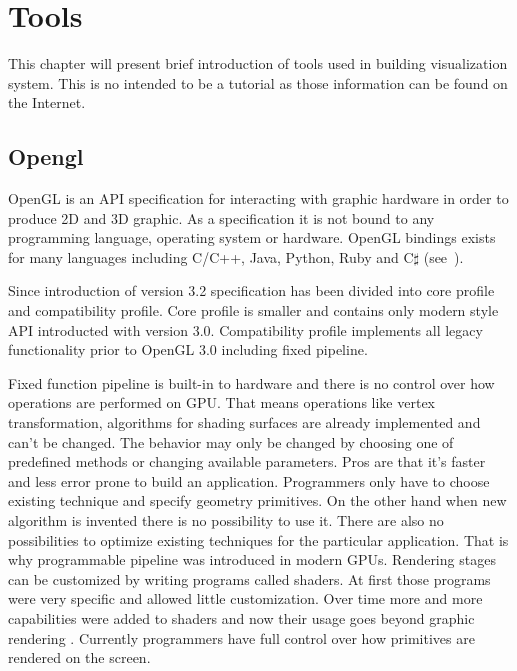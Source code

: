 

\chapter{Tools}


\graphicspath{{tools/figures/}}


This chapter will present brief introduction of tools used in building visualization system. This is no intended to be a tutorial as those information can be found on the Internet. 

\section{Opengl}
OpenGL is an API specification for interacting with graphic hardware in order to produce 2D and 3D graphic. 
As a specification it is not bound to any programming language, operating system or hardware. 
OpenGL bindings exists for many languages including C/C++, Java, Python, Ruby and C$\sharp$ (see~\cite{OglBindings}). 

Since introduction of version 3.2 specification has been divided into core profile and compatibility profile. Core profile is smaller and contains only modern style API introducted with version 3.0. Compatibility profile implements all legacy functionality prior to OpenGL 3.0 including fixed pipeline. 

Fixed function pipeline is built-in to hardware and there is no control over how operations are performed on GPU. That means operations like vertex transformation, algorithms for shading surfaces are already implemented and can't be changed. The behavior may only be changed by choosing one of predefined methods or changing available parameters. Pros are that it's faster and less error prone to build an application. Programmers only have to choose existing technique and specify geometry primitives. On the other hand when new algorithm is invented there is no possibility to use it. There are also no possibilities to optimize existing techniques for the particular application. 
That is why programmable pipeline was introduced in modern GPUs. Rendering stages can be customized by writing programs called shaders. At first those programs were very specific and allowed little customization. Over time more and more capabilities were added to shaders and now their usage goes beyond graphic rendering \cite[Part~VI]{GPUGems3}. Currently programmers have full control over how primitives are rendered on the screen.

